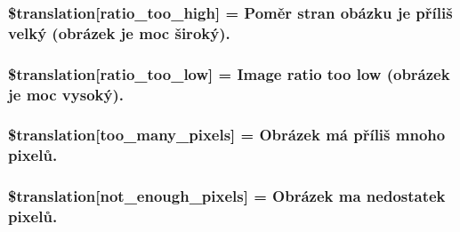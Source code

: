 \subsubsection[{\$translation}]{\setlength{\rightskip}{0pt plus 5cm}\$translation\mbox{[}\textquotesingle{}ratio\+\_\+too\+\_\+high\textquotesingle{}\mbox{]} = \textquotesingle{}Poměr stran obázku je příliš velký (obrázek je moc široký).\textquotesingle{}}\label{class_8upload_8cs___c_s_8php_a23396f6ce7f31e5e5f1b57580621d982}
\hypertarget{class_8upload_8cs___c_s_8php_ac533b9a479f056b0b8623e4268f068c2}{}
\subsubsection[{\$translation}]{\setlength{\rightskip}{0pt plus 5cm}\$translation\mbox{[}\textquotesingle{}ratio\+\_\+too\+\_\+low\textquotesingle{}\mbox{]} = \textquotesingle{}Image ratio too low (obrázek je moc vysoký).\textquotesingle{}}\label{class_8upload_8cs___c_s_8php_ac533b9a479f056b0b8623e4268f068c2}
\hypertarget{class_8upload_8cs___c_s_8php_aa4051ef64e94a3f8295c63cf85544016}{}
\subsubsection[{\$translation}]{\setlength{\rightskip}{0pt plus 5cm}\$translation\mbox{[}\textquotesingle{}too\+\_\+many\+\_\+pixels\textquotesingle{}\mbox{]} = \textquotesingle{}Obrázek má příliš mnoho pixelů.\textquotesingle{}}\label{class_8upload_8cs___c_s_8php_aa4051ef64e94a3f8295c63cf85544016}
\hypertarget{class_8upload_8cs___c_s_8php_a1fe342c27ce61f4ff4e0120ba647033e}{}
\subsubsection[{\$translation}]{\setlength{\rightskip}{0pt plus 5cm}\$translation\mbox{[}\textquotesingle{}not\+\_\+enough\+\_\+pixels\textquotesingle{}\mbox{]} = \textquotesingle{}Obrázek ma nedostatek pixelů.\textquotesingle{}}\label{class_8upload_8cs___c_s_8php_a1fe342c27ce61f4ff4e0120ba647033e}
\hypertarget{class_8upload_8cs___c_s_8php_a4ce76e7be0b3a03c2b47f6d70c21832e}{}
